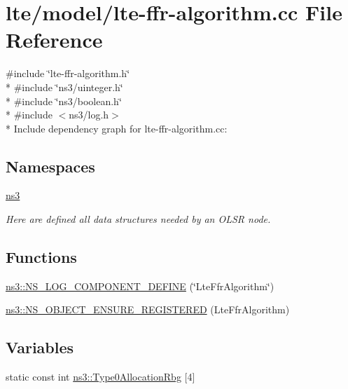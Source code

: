\hypertarget{lte-ffr-algorithm_8cc}{}\section{lte/model/lte-\/ffr-\/algorithm.cc File Reference}
\label{lte-ffr-algorithm_8cc}
{\ttfamily \#include \char`\"{}lte-\/ffr-\/algorithm.\+h\char`\"{}}\\*
{\ttfamily \#include \char`\"{}ns3/uinteger.\+h\char`\"{}}\\*
{\ttfamily \#include \char`\"{}ns3/boolean.\+h\char`\"{}}\\*
{\ttfamily \#include $<$ns3/log.\+h$>$}\\*
Include dependency graph for lte-\/ffr-\/algorithm.cc\+:
\subsection*{Namespaces}
\begin{DoxyCompactItemize}
\item 
 \hyperlink{namespacens3}{ns3}
\begin{DoxyCompactList}\small\item\em Here are defined all data structures needed by an O\+L\+SR node. \end{DoxyCompactList}\end{DoxyCompactItemize}
\subsection*{Functions}
\begin{DoxyCompactItemize}
\item 
\hyperlink{namespacens3_ac03b7a451442abfb1297cb8f1cc41e14}{ns3\+::\+N\+S\+\_\+\+L\+O\+G\+\_\+\+C\+O\+M\+P\+O\+N\+E\+N\+T\+\_\+\+D\+E\+F\+I\+NE} (\char`\"{}Lte\+Ffr\+Algorithm\char`\"{})
\item 
\hyperlink{namespacens3_a5b0b22fa45635a7dbb17ed02dcfbdcda}{ns3\+::\+N\+S\+\_\+\+O\+B\+J\+E\+C\+T\+\_\+\+E\+N\+S\+U\+R\+E\+\_\+\+R\+E\+G\+I\+S\+T\+E\+R\+ED} (Lte\+Ffr\+Algorithm)
\end{DoxyCompactItemize}
\subsection*{Variables}
\begin{DoxyCompactItemize}
\item 
static const int \hyperlink{namespacens3_ae42dc1cda5a7bc1f52f3c0ecf60f5f3b}{ns3\+::\+Type0\+Allocation\+Rbg} \mbox{[}4\mbox{]}
\end{DoxyCompactItemize}
